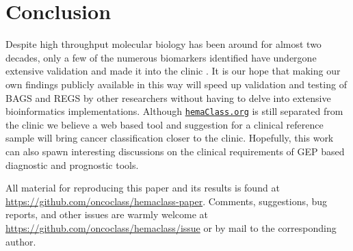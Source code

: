 \documentclass[twocolumn]{bmcart}%
\newcommand{\hemaClass}{\href{http://hemaClass.org}{\texttt{hemaClass.org}}}
\begin{document}
\section{Conclusion}
Despite high throughput molecular biology has been around for almost two decades, only a few of the numerous biomarkers identified have undergone extensive validation and made it into the clinic \cite{Chen2012a}.
It is our hope that making our own findings publicly available in this way will speed up validation and testing of BAGS and REGS by other researchers without having to delve into extensive bioinformatics implementations.
Although \hemaClass{} is still separated from the clinic we believe a web based tool and suggestion for a clinical reference sample will bring cancer classification closer to the clinic.
Hopefully, this work can also spawn interesting discussions on the clinical requirements of GEP based diagnostic and prognostic tools.

All material for reproducing this paper and its results is found at \url{https://github.com/oncoclass/hemaclass-paper}.
Comments, suggestions, bug reports, and other issues are warmly welcome at \url{https://github.com/oncoclass/hemaclass/issue} or by mail to the corresponding author.

\end{document}
